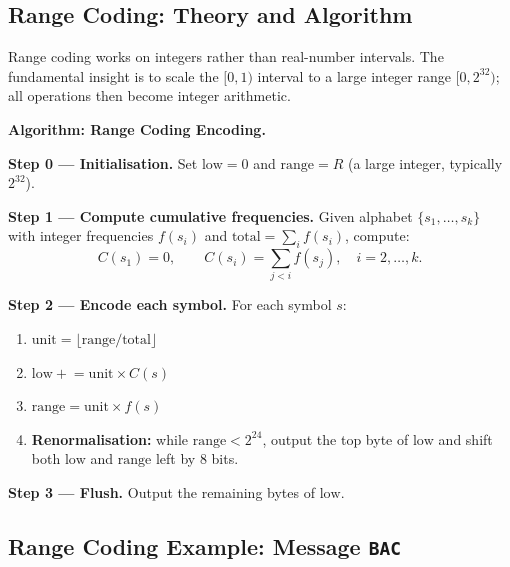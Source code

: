 \subsection{Range Coding: Theory and Algorithm}

Range coding works on integers rather than real-number intervals. The
fundamental insight is to scale the $[0,1)$ interval to a large integer range
$[0, 2^{32})$; all operations then become integer arithmetic.

\begin{definitionbox}
\textbf{Algorithm: Range Coding Encoding.}

\textbf{Step 0 — Initialisation.}
Set $\mathrm{low} = 0$ and $\mathrm{range} = R$ (a large integer, typically
$2^{32}$).

\medskip
\textbf{Step 1 — Compute cumulative frequencies.}
Given alphabet $\{s_1, \ldots, s_k\}$ with integer frequencies $f(s_i)$ and
$\mathrm{total} = \sum_i f(s_i)$, compute:
\[
  C(s_1) = 0, \qquad C(s_i) = \sum_{j < i} f(s_j), \quad i = 2, \ldots, k.
\]

\textbf{Step 2 — Encode each symbol.}
For each symbol $s$:
\begin{enumerate}[leftmargin=2em]
    \item $\mathrm{unit} = \lfloor \mathrm{range} / \mathrm{total} \rfloor$
    \item $\mathrm{low} \mathrel{+}= \mathrm{unit} \times C(s)$
    \item $\mathrm{range} = \mathrm{unit} \times f(s)$
    \item \textbf{Renormalisation:} while $\mathrm{range} < 2^{24}$, output
          the top byte of $\mathrm{low}$ and shift both $\mathrm{low}$ and
          $\mathrm{range}$ left by 8 bits.
\end{enumerate}

\textbf{Step 3 — Flush.}
Output the remaining bytes of $\mathrm{low}$.
\end{definitionbox}

\subsection{Range Coding Example: Message \texttt{BAC}}

